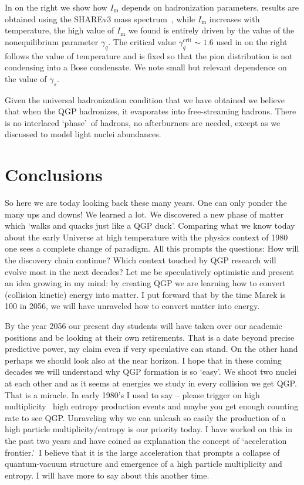 \documentclass{appolb}
\begin{document}
In  on the right we show how $I_\mathrm{m}$ depends on hadronization parameters, results are obtained using the SHAREv3 mass spectrum~\cite{Petran:2016}, while $I_\mathrm{m}$ increases with temperature, the high value of $I_\mathrm{m}$ we found is entirely driven by the value of the nonequilibrium parameter $\gamma_q$. The critical value $\gamma_q^\mathrm{crit}\sim 1.6$ used in  on the right follows the value of temperature and is fixed so that the pion distribution is not condensing into a Bose condensate. We note small but relevant dependence on the value of $\gamma_s$.

Given the universal hadronization condition that we have obtained we believe that when the QGP hadronizes, it evaporates into free-streaming hadrons. There is no interlaced \lq phase\rq\ of hadrons, no afterburners are needed, except as we discussed to model light  nuclei abundances. 

\section{Conclusions}\label{sec:conc}
 
So here we are today looking back these many years. One can only ponder the many ups and downs! We learned a lot. We discovered a new phase of matter which \lq walks and quacks just like a QGP duck\rq. Comparing what we know today about the early Universe at high temperature with the physics context of 1980 one sees a complete change of paradigm. All this prompts the questions: How will the discovery chain continue? Which context touched by QGP research will evolve most in the next decades? Let me be speculatively optimistic and present an idea growing in my mind: by creating QGP we are learning how to convert (collision kinetic) energy into matter. I put forward that by the time Marek is 100 in 2056, we will have unraveled how to convert matter into energy.

By the year 2056 our present day students will have taken over our academic positions and be looking at their own retirements. That is a date beyond precise predictive power, my claim even if very speculative can stand. On the other hand perhaps we should look also at the near horizon. I hope that in these coming decades we will understand why QGP formation is so \lq easy\rq. We shoot two nuclei at each other and as it seems at energies we study in every collision we get QGP. That is a miracle. In early 1980\rq s I used to say -- please trigger on high multiplicity \ie\ high entropy production events and maybe you get enough counting rate to see QGP. Unraveling why we can unleash so easily the production of a high particle multiplicity/entropy is our priority today. I have worked on this in the past two years and have coined as explanation the concept of \lq acceleration frontier.\rq\ I believe that it is the large acceleration that prompts a collapse of quantum-vacuum structure and emergence of a high particle multiplicity and entropy. I will have more to say about this another time.
\end{document}

